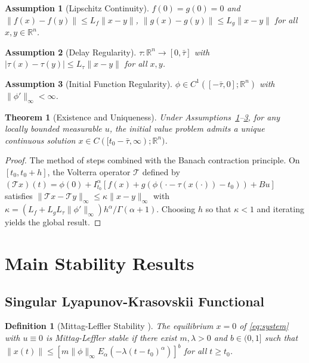 \documentclass[12pt,a4paper]{article}
\newtheorem{theorem}{Theorem}
\newtheorem{definition}{Definition}
\newtheorem{assumption}{Assumption}
\begin{document}
\begin{assumption}[Lipschitz Continuity]
\label{ass:lipschitz}
$f(0) = g(0) = 0$ and $\|f(x) - f(y)\| \leq L_f \|x - y\|$, $\|g(x) - g(y)\| \leq L_g \|x - y\|$ for all $x, y \in \mathbb{R}^n$.
\end{assumption}

\begin{assumption}[Delay Regularity]
\label{ass:delay_lipschitz}
$\tau: \mathbb{R}^n \to [0, \bar{\tau}]$ with $|\tau(x) - \tau(y)| \leq L_{\tau} \|x - y\|$ for all $x, y$.
\end{assumption}

\begin{assumption}[Initial Function Regularity]
\label{ass:initial_regularity}
$\phi \in C^1([-\bar{\tau}, 0]; \mathbb{R}^n)$ with $\|\phi'\|_{\infty} < \infty$.
\end{assumption}

\begin{theorem}[Existence and Uniqueness]
\label{thm:existence}
Under Assumptions~\ref{ass:lipschitz}--\ref{ass:initial_regularity}, for any locally bounded measurable $u$, the initial value problem admits a unique continuous solution $x \in C([t_0 - \bar{\tau}, \infty); \mathbb{R}^n)$.
\end{theorem}

\begin{proof}
The method of steps combined with the Banach contraction principle. On $[t_0, t_0+h]$, the Volterra operator $\mathcal{T}$ defined by $(\mathcal{T}x)(t) = \phi(0) + I^{\alpha}_{t_0}[f(x) + g(\phi(\cdot - \tau(x(\cdot)) - t_0)) + Bu]$ satisfies $\|\mathcal{T}x - \mathcal{T}y\|_{\infty} \leq \kappa \|x-y\|_{\infty}$ with $\kappa = (L_f + L_g L_{\tau} \|\phi'\|_{\infty})h^{\alpha}/\Gamma(\alpha+1)$. Choosing $h$ so that $\kappa < 1$ and iterating yields the global result.
\end{proof}


\section{Main Stability Results}
\label{sec:stability}

\subsection{Singular Lyapunov-Krasovskii Functional}

\begin{definition}[Mittag-Leffler Stability {\cite{li2009}}]
\label{def:ml_stability}
The equilibrium $x = 0$ of \eqref{eq:system} with $u \equiv 0$ is Mittag-Leffler stable if there exist $m, \lambda > 0$ and $b \in (0,1]$ such that $\|x(t)\| \leq [ m \|\phi\|_{\infty} E_{\alpha}(-\lambda (t-t_0)^{\alpha}) ]^b$ for all $t \geq t_0$.
\end{definition}
\end{document}
